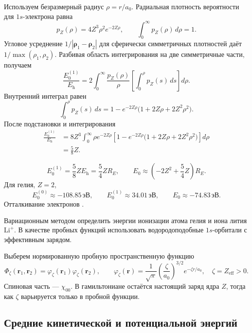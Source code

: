 \documentclass[../final.tex]{subfiles}
\begin{document}
Используем безразмерный радиус $\rho=r/a_0$.
Радиальная плотность вероятности для $1s$-электрона равна
\[
    p_Z(\rho)=4Z^3\rho^2e^{-2Z\rho},\qquad
    \int_0^\infty p_Z(\rho)\,d\rho=1.
\]
Угловое усреднение $1/|\boldsymbol\rho_1-\boldsymbol\rho_2|$
для сферически симметричных плотностей даёт $1/\max(\rho_1,\rho_2)$.
Разбивая область интегрирования на две симметричные части, получаем
\[
    \frac{E_0^{(1)}}{E_{\mathrm h}}
      =2\int_0^\infty\frac{p_Z(\rho)}\rho
        \left[\int_0^\rho p_Z(s)\,ds\right]d\rho.
\]
Внутренний интеграл равен
\[
    \int_0^\rho p_Z(s)\,ds
      =1-e^{-2Z\rho}\bigl(1+2Z\rho+2Z^2\rho^2\bigr).
\]
После подстановки и интегрирования
\begin{align*}
    \frac{E_0^{(1)}}{E_{\mathrm h}}
      &=8Z^3\int_0^\infty\rho e^{-2Z\rho}
        \left[1-e^{-2Z\rho}
        \bigl(1+2Z\rho+2Z^2\rho^2\bigr)\right]d\rho\\
      &=\frac58Z.
\end{align*}

\answer
\[
    E_0^{(1)}=\frac58ZE_{\mathrm h}=\frac54ZR_E,\qquad
    E_0\approx\left(-2Z^2+\frac54Z\right)R_E.
\]
Для гелия, $Z=2$,
\[
    E_0^{(0)}\approx-108.85\,\text{эВ},\qquad
    E_0^{(1)}\approx34.01\,\text{эВ},\qquad
    E_0\approx-74.83\,\text{эВ}.
\]
Отталкивание электронов .

\label{task:fiham5_variational}

\condition
Вариационным методом определить энергии ионизации атома гелия
и иона лития $\mathrm{Li}^+$. В качестве пробных функций использовать
водородоподобные $1s$-орбитали с эффективным зарядом.

\solution
Выберем нормированную пробную пространственную функцию
\[
    \Phi_\zeta(\mathbf r_1,\mathbf r_2)
       =\varphi_\zeta(\mathbf r_1)\varphi_\zeta(\mathbf r_2),\qquad
    \varphi_\zeta(\mathbf r)=\frac1{\sqrt\pi}
        \left(\frac\zeta{a_0}\right)^{3/2}e^{-\zeta r/a_0},
    \quad \zeta=Z_{\mathrm{eff}}>0.
\]
Спиновая часть --- $\chi_{00}$. В гамильтониане остаётся настоящий
заряд ядра $Z$, тогда как $\zeta$ варьируется только в пробной функции.

\subsection*{Средние кинетической и потенциальной энергий}
\end{document}

